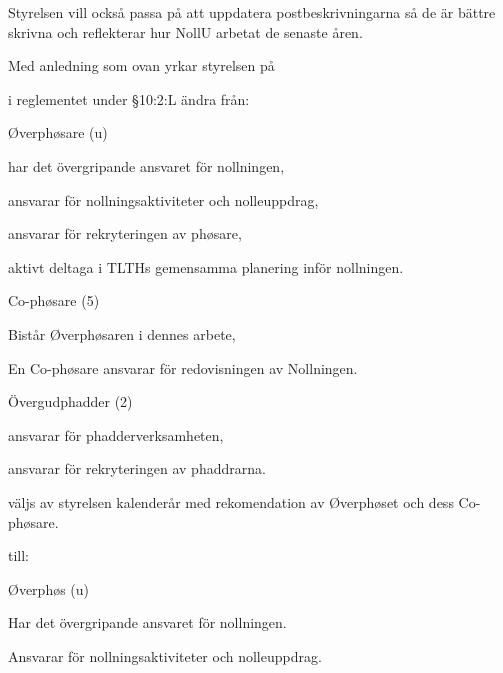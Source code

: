 \documentclass[../_main/handlingar.tex]{subfiles}
\begin{document}
Styrelsen vill också passa på att uppdatera postbeskrivningarna så de är bättre skrivna och reflekterar hur NollU arbetat de senaste åren.

\newpage
Med anledning som ovan yrkar styrelsen på

\begin{attsatser}
    \att i reglementet under \S10:2:L ändra från:\par
    \begin{emptylist}
        \item Øverphøsare (u)
            \begin{dashlist}
                \item har det övergripande ansvaret för nollningen,
                \item ansvarar för nollningsaktiviteter och nolleuppdrag,
                \item ansvarar för rekryteringen av phøsare,
                \item aktivt deltaga i TLTHs gemensamma planering inför nollningen.
            \end{dashlist}
        \item Co-phøsare (5)
            \begin{dashlist}
                \item Bistår Øverphøsaren i dennes arbete,
                \item En Co-phøsare ansvarar för redovisningen av Nollningen.
            \end{dashlist}
        \item Övergudphadder (2)
            \begin{dashlist}
                \item ansvarar för phadderverksamheten,
                \item ansvarar för rekryteringen av phaddrarna.
                \item väljs av styrelsen kalenderår med rekomendation av Øverphøset och dess Co-phøsare.
            \end{dashlist}
    \end{emptylist}
    till:
    \begin{emptylist}
        \item Øverphøs (u)
            \begin{dashlist}
                \item Har det övergripande ansvaret för nollningen.
                \item Ansvarar för nollningsaktiviteter och nolleuppdrag.

\end{dashlist}
\end{emptylist}
\end{attsatser}
\end{document}
